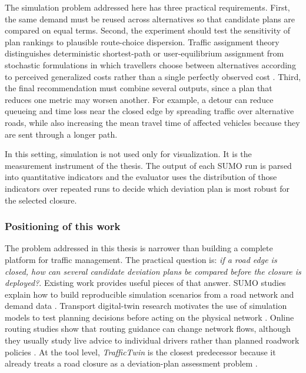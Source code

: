 The simulation problem addressed here has three practical requirements. First, the same demand must
be reused across alternatives so that candidate plans are compared on equal terms. Second, the
experiment should test the sensitivity of plan rankings to plausible route-choice dispersion.
Traffic assignment theory distinguishes deterministic shortest-path or user-equilibrium assignment
from stochastic formulations in which travellers choose between alternatives according to perceived
generalized costs rather than a single perfectly observed cost \cite{modelling_transport}.
Third, the final recommendation must combine several outputs, since a plan that reduces one metric
may worsen another. For example, a detour can reduce queueing and time loss near the closed edge by
spreading traffic over alternative roads, while also increasing the mean travel time of affected
vehicles because they are sent through a longer path.

In this setting, simulation is not used only for visualization. It is the measurement instrument of
the thesis. The output of each SUMO run is parsed into quantitative indicators and the evaluator
uses the distribution of those indicators over repeated runs to decide which deviation plan is most
robust for the selected closure.

\subsubsection{Positioning of this work}

The problem addressed in this thesis is narrower than building a complete platform for traffic
management. The practical question is: \emph{if a road edge is closed, how can several candidate deviation
plans be compared before the closure is deployed?}. Existing work provides useful pieces of that
answer. SUMO studies explain how to build reproducible simulation scenarios from a road network and
demand data \cite{sumo_tutorial,sparse_data_SUMO}. Transport digital-twin research motivates the
use of simulation models to test planning decisions before acting on the physical network
\cite{intelligent_transport,digital_twin_transport}. Online routing studies show that routing
guidance can change network flows, although they usually study live advice to individual drivers
rather than planned roadwork policies \cite{jalota_online_routing_2021,toso_route_recommendations_2023}.
At the tool level, \textit{TrafficTwin} is the closest predecessor because it already treats a road
closure as a deviation-plan assessment problem \cite{SIM_param}.

